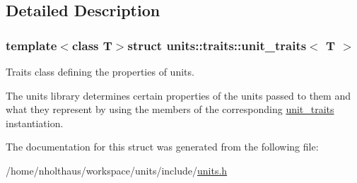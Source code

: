 \subsection{Detailed Description}
\subsubsection*{template$<$class T$>$struct units\+::traits\+::unit\+\_\+traits$<$ T $>$}

Traits class defining the properties of units. 

The units library determines certain properties of the units passed to them and what they represent by using the members of the corresponding \hyperlink{structunits_1_1traits_1_1unit__traits}{unit\+\_\+traits} instantiation. 

The documentation for this struct was generated from the following file\+:\begin{DoxyCompactItemize}
\item 
/home/nholthaus/workspace/units/include/\hyperlink{units_8h}{units.\+h}\end{DoxyCompactItemize}
